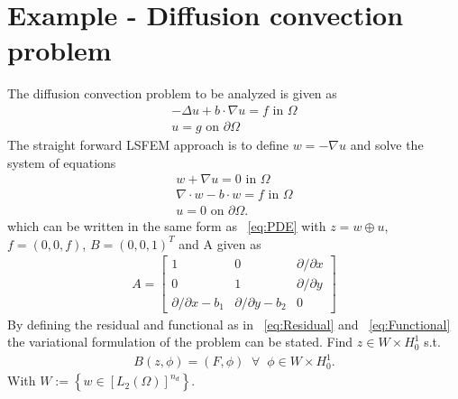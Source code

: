 \section{Example - Diffusion convection problem}
%
The diffusion convection problem to be analyzed is given as 
\begin{align}
	-\Delta u + b \cdot \nabla u = f \text{ in } \Omega \\
	u = g \text{ on } \partial \Omega
	\label{eq:DiffTrans}
\end{align}
The straight forward LSFEM approach is to define $w = -\nabla u$ and solve the system of equations 
\begin{align}
	w + \nabla u = 0 \text{ in } \Omega \\
	\nabla \cdot w - b \cdot w = f \text{ in } \Omega \\
	u = 0 \text{ on } \partial \Omega.
	\label{eq:DiffTransSystem}
\end{align}
which can be written in the same form as ~\ref{eq:PDE} with $ z = w \oplus u $, $f = (0,0,f)$, $B = (0,0,1)^T $ and A given as 
\begin{align}
	A =
	\begin{bmatrix}
		1 & 0 & \partial / \partial x  \\
		0 & 1 & \partial / \partial y  \\
		\partial / \partial x - b_1 & \partial/ \partial y -b_2 & 0
	\end{bmatrix}
	\label{eq:AmatrixDiff}
\end{align}
By defining the residual and functional as in ~\ref{eq:Residual} and ~\ref{eq:Functional} the variational formulation of the problem can be stated. Find $ z \in W \times H_0^1$ s.t.
\begin{align}
	B(z,\phi) = (F,\phi) \;\; \forall \;\; \phi \in W \times H_0^1.
	\label{eq:VariationalFormulation}
\end{align}
With $W := \left\{ w \in \left[L_2(\Omega)\right]^{n_d}\right\}$.
